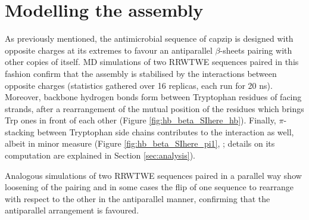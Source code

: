 \section{Modelling the assembly} \label{sec:build}

As previously mentioned, the antimicrobial sequence of capzip is designed with opposite charges at its extremes to favour an antiparallel $\beta$-sheets pairing with other copies of itself.
%
MD simulations of two RRWTWE sequences paired in this fashion confirm that the assembly is stabilised by the interactions between opposite charges (statistics gathered over 16 replicas, each run for 20 ns).
%
Moreover, backbone hydrogen bonds form between Tryptophan residues of facing strands, after a rearrangement of the mutual position of the residues which brings Trp ones in front of each other (Figure \ref{fig:hb_beta_SIhere_hb}).
%
Finally, $\pi$-stacking between Tryptophan side chains contributes to the interaction as well, albeit in minor measure (Figure \ref{fig:hb_beta_SIhere_pi1}, ; details on its computation are explained in Section \ref{sec:analysis}).

Analogous simulations of two RRWTWE sequences paired in a parallel way show loosening of the pairing and in some cases the flip of one sequence to rearrange with respect to the other in the antiparallel manner, confirming that the antiparallel arrangement is favoured.

